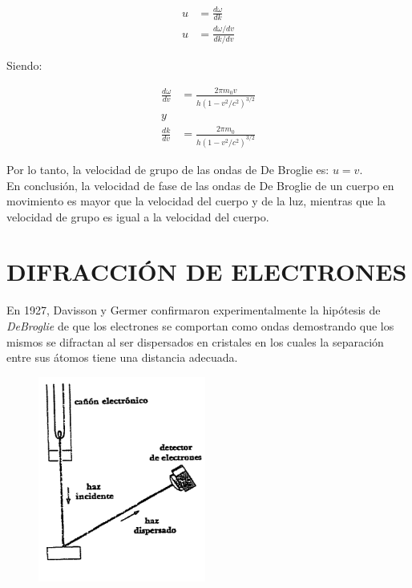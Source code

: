 \documentclass[a4paper]{article}
\begin{document}
    \begin{align}
        u &= \frac{d\omega}{dk} \tag*{} \\[10pt]
        u &= \frac{d\omega/dv}{dk/dv} \tag*{} 
    \end{align}

    \indent Siendo:

    \begin{align}
        \frac{d\omega}{dv} &= \frac{2 \pi m_0 v}{h(1-v^2/c^2)^{3/2}} \tag*{} \\[10pt]
        y \tag*{}\\[10pt]
        \frac{dk}{dv} &= \frac{2 \pi m_0}{h(1-v^2/c^2)^{3/2}} \tag*{}
    \end{align}

    \indent Por lo tanto, la velocidad de grupo de las ondas de De Broglie es: $u=v$.\\

    \indent En conclusión, la velocidad de fase de las ondas de De Broglie de un cuerpo en movimiento es mayor que la velocidad del cuerpo y de la luz, mientras que la velocidad de grupo es igual a la velocidad del cuerpo.\\

\section{DIFRACCIÓN DE ELECTRONES}

\indent En 1927, Davisson y Germer confirmaron experimentalmente la hipótesis de \textit{DeBroglie} de que los electrones se comportan como ondas demostrando que los mismos se difractan al ser dispersados en cristales en los cuales la separación entre sus átomos tiene una distancia adecuada.\\

    \begin{figure}[h!]
        \centering
        \includegraphics[width = 5.5cm]{../imagenes/Experimento.png}
    \end{figure}
\end{document}
